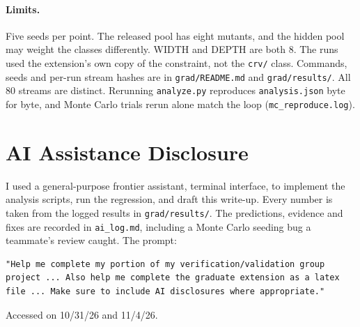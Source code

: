 \documentclass[11pt]{article}
\begin{document}
\paragraph{Limits.}
Five seeds per point. The released pool has eight mutants, and the hidden pool
may weight the classes differently. WIDTH and DEPTH are both 8. The runs used the
extension's own copy of the constraint, not the \texttt{crv/} class.
Commands, seeds and per-run stream hashes are in \texttt{grad/README.md} and
\texttt{grad/results/}. All 80 streams are distinct. Rerunning
\texttt{analyze.py} reproduces \texttt{analysis.json} byte for byte, and
Monte Carlo trials rerun alone match the loop (\texttt{mc\_reproduce.log}).

\section*{AI Assistance Disclosure}

I used a general-purpose frontier assistant, terminal interface, to implement
the analysis scripts, run the regression, and draft this write-up. Every
number is taken from the logged results in \texttt{grad/results/}. The
predictions, evidence and fixes are recorded in \texttt{ai\_log.md}, including a
Monte Carlo seeding bug a teammate's review caught. The prompt:

\begin{lstlisting}
"Help me complete my portion of my verification/validation group project ... Also help me complete the graduate extension as a latex file ... Make sure to include AI disclosures where appropriate."
\end{lstlisting}

\noindent
Accessed on 10/31/26 and 11/4/26.
\end{document}
